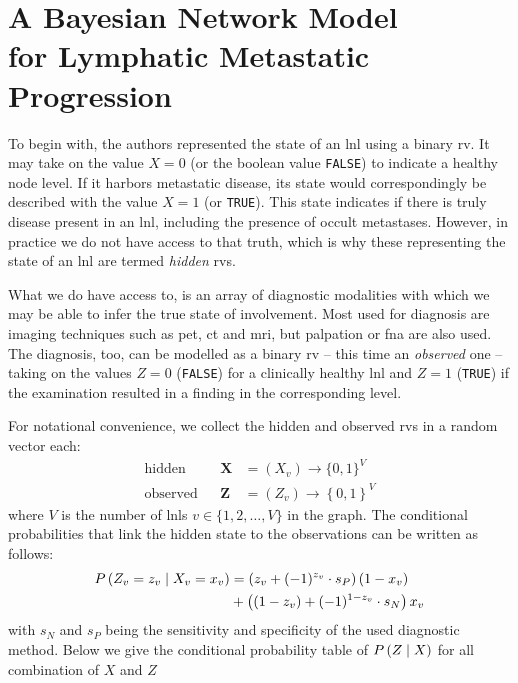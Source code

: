 \documentclass[\relativeRoot/main.tex]{subfiles}
\begin{document}
\section[A Bayesian Network Model for Lymphatic Metastatic Progression]{A Bayesian Network Model\\for Lymphatic Metastatic Progression}
\label{sec:previous_work:bayesian_network}

To begin with, the authors  represented the state of an \gls{lnl} using a binary \gls{rv}. It may take on the value $X=0$ (or the boolean value \texttt{FALSE}) to indicate a healthy node level. If it harbors metastatic disease, its state would correspondingly be described with the value $X=1$ (or \texttt{TRUE}). This state indicates if there is truly disease present in an \gls{lnl}, including the presence of occult metastases. However, in practice we do not have access to that truth, which is why these  representing the state of an \gls{lnl} are termed \emph{hidden} \glspl{rv}.

What we do have access to, is an array of diagnostic modalities with which we may be able to infer the true state of involvement. Most used for diagnosis are imaging techniques such as \gls{pet}, \gls{ct} and \gls{mri}, but palpation or \gls{fna} are also used. The diagnosis, too, can be modelled as a binary \gls{rv} -- this time an \emph{observed} one -- taking on the values $Z=0$ (\texttt{FALSE}) for a clinically healthy \gls{lnl} and $Z=1$ (\texttt{TRUE}) if the examination resulted in a finding in the corresponding level.

For notational convenience, we collect the hidden and observed \glspl{rv} in a random vector each:
%
\begin{equation} \label{eq:bn:variables}
    \begin{aligned}
        \text{hidden}& & \mathbf{X} &= ( X_v ) \rightarrow \{ 0,1 \}^V \\
        \text{observed}& & \mathbf{Z} &= ( Z_v ) \rightarrow \left\{ 0, 1 \right\}^V
    \end{aligned}
\end{equation}
%
where $V$ is the number of \glspl{lnl} $v \in \{ 1,2,\ldots,V \}$ in the graph. The conditional probabilities that link the hidden state to the observations can be written as follows:
%
\begin{equation}
    \begin{aligned}
        P \left( Z_v = z_v \mid X_v = x_v \right) &= \left( z_v + (-1)^{z_v} \cdot s_P \right)(1 - x_v) \\ 
        &+ \left( (1 - z_v) + (-1)^{1 - z_v} \cdot s_N \right) x_v
    \end{aligned}
\end{equation}
%
with $s_N$ and $s_P$ being the sensitivity and specificity of the used diagnostic method. Below we give the conditional probability table of $P \left( Z \mid X \right)$ for all combination of $X$ and $Z$
\end{document}
